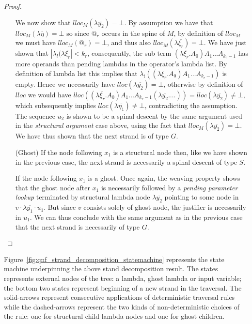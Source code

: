 \documentclass{article}
\theoremstyle{definition}
\begin{document}
\begin{proof}
\begin{enumerate}
We now show that $lloc_M(\lambda\overline{y_2})=\bot$.
By assumption we have that $lloc_M(\lambda\overline{\eta}) =\bot$ so since $@_r$ occurs in the spine of $M$, by definition of $lloc_M$ we must have $lloc_M(@_r) =\bot$, and thus also $lloc_M(\lambda\overline{\xi_r}) = \bot$. We have just shown that $|\lambda_l(\lambda\overline{\xi_r}| < k_r$, consequently, the sub-term $(\lambda\overline{\xi_r} . A_0) A_1 \ldots A_{k_r-1}$ has more operands than pending lambdas in the operator's lambda list. By definition of lambda list this implies that $\lambda_l((\lambda\overline{\xi_r} . A_0) A_1 \ldots A_{k_r-1})$ is empty. Hence we necessarily have $lloc(\lambda\overline{y_2}) = \bot$, otherwise by definition of $lloc$ we would have
 $lloc((\lambda\overline{\xi_r} . A_0) A_1 \ldots A_{k_r-1} (\lambda\overline{y_2}. \ldots)) = lloc(\lambda\overline{y_2}) \ne \bot$, which subsequently implies $lloc(\lambda\overline{\eta_1})\ne\bot$, contradicting the assumption.
The sequence $u_2$ is shown to be a spinal descent by the same argument used in the \emph{structural argument} case above, using the fact that $lloc_M(\lambda\overline{y_2})=\bot$. We have thus shown that the next strand is of type $G$.

\item[(Ghost)] If the node following $x_1$ is a structural node then, like we have shown in the previous case, the next strand is necessarily a spinal descent of type $S$.

If the node following $x_1$ is a ghost.
Once again, the weaving property shows that the ghost node after $x_1$ is necessarily followed by a \emph{pending parameter lookup} terminated by structural lambda node $\lambda\overline{y_2}$ pointing to some node in $v \cdot \lambda\overline{y_1} \cdot u_1$.
But since $v$ consists solely of ghost node, the justifier is necessarily in $u_1$. We can thus conclude with the same argument as in the previous case that the next strand is necessarily of type
$G$.
\end{enumerate}
\end{proof}

Figure~\ref{fig:qnf_strand_decomposition_statemachine} represents the state machine underpinning the above stand decomposition result. The states represents external nodes of the tree: a lambda, ghost lambda or input variable; the bottom two states represent beginning of a new strand in the traversal.
The solid-arrows represent consecutive applications of deterministic traversal rules while the dashed-arrows represent the two kinds of non-deterministic choices of the  rule: one for structural child lambda nodes and one for ghost children.
\end{document}
